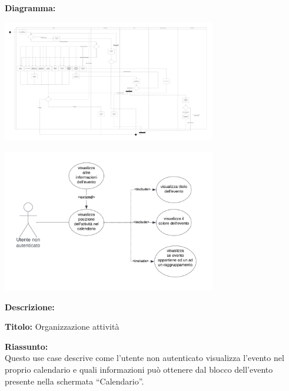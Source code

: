 \begin{listaPersonale}[UC]{}
    \textbf{Diagramma:}
    \begin{center}
        \includegraphics[width=0.7\textwidth]{img/Diagrammi/DS/DS_CreazioneModificaEvento.png}
    \end{center}




    \newpage


    \begin{center}
        \includegraphics[width=0.7\textwidth]{img/Diagrammi/UseCases/InserimentoAutomaticoCalendario.png}
    \end{center}

    \textbf{Descrizione:}

    \textbf{Titolo:} Organizzazione attività

    \textbf{Riassunto:} \\
    Questo use case descrive come l'utente non autenticato visualizza l'evento nel proprio calendario e quali informazioni può ottenere dal blocco dell'evento presente nella schermata “Calendario”.


\end{listaPersonale}
